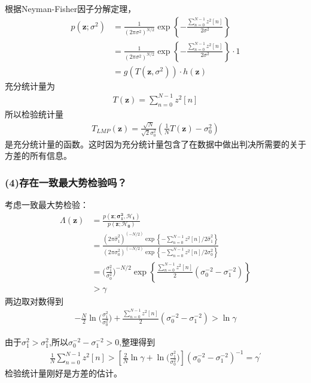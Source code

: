 \documentclass[fontset=windows]{article}
\numberwithin{figure}{section}
\begin{document}
根据Neyman-Fisher因子分解定理，
\begin{align*}
	p(\mathbf{z};\sigma^2)
	 & =\frac{1}{(2\pi \sigma^2)^{N/2}}\exp\left\{ -\frac{\sum_{n=0}^{N-1}z^2[n]}{2\sigma^2}\right\}        \\
	 & =\frac{1}{(2\pi \sigma^2)^{N/2}}\exp\left\{ -\frac{\sum_{n=0}^{N-1}z^2[n]}{2\sigma^2}\right\}\cdot 1 \\
	 & =g(T(\mathbf{z},\sigma^2))\cdot h(\mathbf{z})
\end{align*}
充分统计量为
\begin{align*}
	T(\mathbf{z})=\sum_{n=0}^{N-1}z^2[n]
\end{align*}
所以检验统计量
\begin{align*}
	T_{LMP}(\mathbf{z})=\frac{\sqrt{N}}{\sqrt{2}\sigma^2_0}(\frac{1}{N}T(\mathbf{z})-\sigma^2_0)
\end{align*}
是充分统计量的函数。这时因为充分统计量包含了在数据中做出判决所需要的关于方差的所有信息。
\subsubsection*{(4)存在一致最大势检验吗？}
考虑一致最大势检验：
\begin{align*}
	\Lambda(\mathbf{z})
	 & =\frac{p(\mathbf{z;\sigma^2_1,\mathcal{H}_1})}{p(\mathbf{z;\mathcal{H}_0})}                            \\
	 & =\frac{(2\pi \hat{\sigma}_1^2)^{(-N/2)}\exp \left\{ -\sum_{n=0}^{N-1}z^2[n]/2\hat{\sigma}_1^2\right\}}
	{(2\pi \sigma_0^2)^{(-N/2)}
	\exp \left\{ -\sum_{n=0}^{N-1}z^2[n]/2\sigma^2_0\right\}}                                                 \\
	 & =\bigg(\frac{\sigma_1^2}{\sigma_0^2}\bigg)^{-N/2}
	\exp \left\{\frac{\sum_{n=0}^{N-1}z^2[n]}{2}(\sigma_0^{-2}-\sigma_1^{-2}) \right\}                        \\
	 & >\gamma
\end{align*}
两边取对数得到
\begin{align*}
	-\frac{N}{2}\ln\bigg(\frac{\sigma_1^2}{\sigma_0^2}\bigg)+
	\frac{\sum_{n=0}^{N-1}z^2[n]}{2}(\sigma_0^{-2}-\sigma_1^{-2})>\ln\gamma
\end{align*}

由于\(\sigma_1^2>\sigma_1^2\),所以\(\sigma_0^{-2}-\sigma_1^{-2}>0\),整理得到
\begin{align*}
	\frac{1}{N}\sum_{n=0}^{N-1}z^2[n]>\left[\frac{2}{N}\ln\gamma+\ln\bigg(\frac{\sigma_1^2}{\sigma_0^2}\bigg)\right](\sigma_0^{-2}-\sigma_1^{-2})^{-1}=\gamma^{\prime}
\end{align*}
检验统计量刚好是方差的估计。
\end{document}
